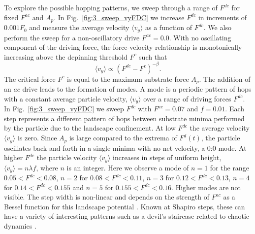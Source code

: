 \documentclass[twocolumn,preprintnumbers,amsmath,amssymb,aps,prb]{revtex4}
\begin{document}
To explore the possible hopping patterns,
we sweep through a range of $F^{dc}$ for fixed $F^{ac}$ and $A_p$.
In Fig.~\ref{fig:3_sweep_vyFDC} 
we increase $F^{dc}$ in increments of $0.001 F_0$
and 
measure the average velocity $\langle v_y \rangle $ 
as a function of $F^{dc}$.
We also perform the sweep for a non-oscillatory drive $F^{ac} = 0.0$.
With no oscillating component of the driving force,
  the force-velocity relationship is monotonically increasing
  above the depinning threshold $F^c$ such that
  \begin{equation}
    \langle v_y \rangle \propto (F^{dc}-F^c)^{-\beta}.
  \end{equation}
  The critical force $F^c$ is equal to the maximum substrate force
  $A_p$. 
  The addition of an $ac$ drive leads
  to the formation of modes.
  A mode is a periodic pattern of hops
  with a constant average particle velocity, $\langle {v}_{y} \rangle$
  over a range of driving forces $F^{dc}$.
  In Fig.~\ref{fig:3_sweep_vyFDC}
  we sweep $F^{dc}$
  with $F^{ac} = 0.07$ and $f=0.01$.
Each step represents a different pattern of hops
between substrate minima
performed by the particle
due to the landscape confinement.  
At 
low $F^{dc}$ the average velocity $\langle v_y \rangle$ is zero.
Since 
$A_p$ is large compared to the extrema of $F^{d}(t)$,
the particle oscillates back and forth
in a single minima with no net velocity,
a 0:0 mode.
At higher $F^{dc}$ the particle velocity 
$\langle v_{y} \rangle$ increases in steps of uniform height,
$\langle v_{y} \rangle = n \lambda f$,
where $n$ is an integer.
Here we observe a mode of $n=1$
for the range $0.05 < F^{dc} < 0.08$,
$n=2$ for $0.08 < F^{dc} < 0.11$,
$n=3$ for $0.12 < F^{dc} < 0.13$,
$n=4$ for $0.14 < F^{dc} < 0.155$ and 
$n=5$ for $0.155 < F^{dc} < 0.16$.
Higher modes are not visible.
The step width is non-linear
and depends on the strength of $F^{ac}$
as a Bessel function 
for this landscape potential \cite{Reichhardt2000,Juniper2017}.
Known at Shapiro steps,
these can have a variety of
interesting patterns
such as a devil's staircase related to chaotic dynamics \cite{Bak1986}.
\end{document}
